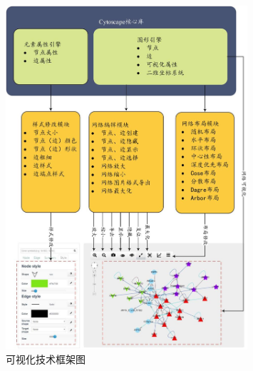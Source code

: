 \begin{figure}[h]
\centering
\includegraphics[width = 0.8\textwidth]{versioframework}
\caption[fig33]{可视化技术框架图}
\label{fig33}
\end{figure}
